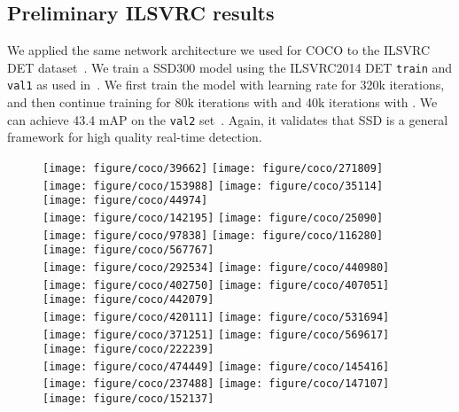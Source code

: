 \documentclass[runningheads]{llncs}
\begin{document}
\subsection{Preliminary ILSVRC results}
We applied the same network architecture we used for COCO to the ILSVRC DET dataset~\cite{russakovsky2014imagenet}. We train a SSD300 model using the ILSVRC2014 DET \texttt{train} and \texttt{val1} as used in~\cite{girshick2014rich}. We first train the model with  learning rate for 320k iterations, and then continue training for 80k iterations with  and 40k iterations with . We can achieve 43.4 mAP on the \texttt{val2} set~\cite{girshick2014rich}. Again, it validates that SSD is a general framework for high quality real-time detection.
\begin{figure}
	\centering
	\texttt{[image: figure/coco/39662]}
	\texttt{[image: figure/coco/271809]}
	\texttt{[image: figure/coco/153988]}
	\texttt{[image: figure/coco/35114]}
	\texttt{[image: figure/coco/44974]}\\
	\texttt{[image: figure/coco/142195]}
	\texttt{[image: figure/coco/25090]}
	\texttt{[image: figure/coco/97838]}
	\texttt{[image: figure/coco/116280]}
	\texttt{[image: figure/coco/567767]}\\
	\texttt{[image: figure/coco/292534]}
	\texttt{[image: figure/coco/440980]}
	\texttt{[image: figure/coco/402750]}
	\texttt{[image: figure/coco/407051]}
	\texttt{[image: figure/coco/442079]}\\
	\texttt{[image: figure/coco/420111]}
	\texttt{[image: figure/coco/531694]}
	\texttt{[image: figure/coco/371251]}
	\texttt{[image: figure/coco/569617]}
	\texttt{[image: figure/coco/222239]}\\
	\texttt{[image: figure/coco/474449]}
	\texttt{[image: figure/coco/145416]}
	\texttt{[image: figure/coco/237488]}
	\texttt{[image: figure/coco/147107]}
	\texttt{[image: figure/coco/152137]}\\

\end{figure}
\end{document}
